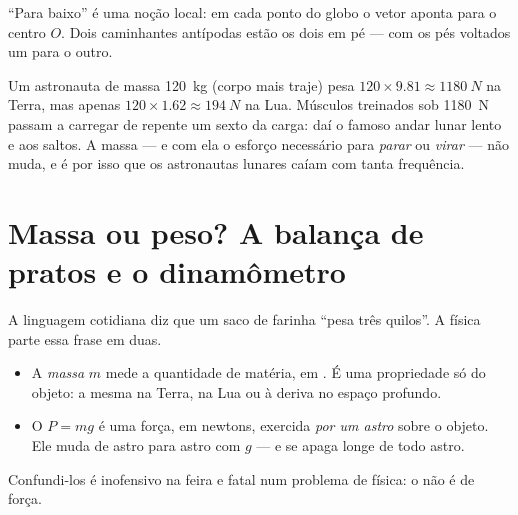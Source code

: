 \begin{omfigure}

{\small ``Para baixo'' é uma noção local: em cada ponto do globo o vetor
 aponta para o centro $O$. Dois caminhantes antípodas estão os dois
em pé --- com os pés voltados um para o outro.}
\end{omfigure}

\begin{remark}\label{rem:g10:universal-gravitation:bounce}
Um astronauta de massa \qty{120}{kg} (corpo mais traje) pesa
$120 \times 9.81 \approx \qty{1180}{N}$ na Terra, mas apenas
$120 \times 1.62 \approx \qty{194}{N}$ na Lua. Músculos treinados sob
\qty{1180}{N} passam a carregar de repente um sexto da carga: daí o
famoso andar lunar lento e aos saltos. A massa --- e com ela o esforço
necessário para \emph{parar} ou \emph{virar} --- não muda, e é por isso
que os astronautas lunares caíam com tanta frequência.
\end{remark}

\section{Massa ou peso? A balança de pratos e o dinamômetro}

A linguagem cotidiana diz que um saco de farinha ``pesa três quilos''. A
física parte essa frase em duas.

\begin{remark}\label{rem:g10:universal-gravitation:massweight}
\begin{itemize}
  \item A \emph{massa} $m$ mede a quantidade de matéria, em .
        É uma propriedade só do objeto: a mesma na Terra, na Lua ou à
        deriva no espaço profundo.
  \item O \emph{} $P = mg$ é uma força, em newtons, exercida
        \emph{por um astro} sobre o objeto. Ele muda de astro para astro
        com $g$ --- e se apaga longe de todo astro.
\end{itemize}
Confundi-los é inofensivo na feira e fatal num problema de física: o
 não é  de força.
\end{remark}

